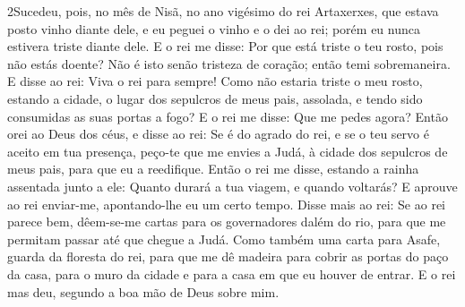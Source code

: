 \lettrine{2} Sucedeu, pois, no mês de Nisã, no ano vigésimo do
rei Artaxerxes, que estava posto vinho diante dele, e eu peguei o
vinho e o dei ao rei; porém eu nunca estivera triste diante dele.
E o rei me disse: Por que está triste o teu rosto, pois não
estás doente? Não é isto senão tristeza de coração; então temi
sobremaneira. E disse ao rei: Viva o rei para sempre! Como não
estaria triste o meu rosto, estando a cidade, o lugar dos sepulcros
de meus pais, assolada, e tendo sido consumidas as suas portas a
fogo? E o rei me disse: Que me pedes agora? Então orei ao Deus
dos céus, e disse ao rei: Se é do agrado do rei, e se o teu
servo é aceito em tua presença, peço-te que me envies a Judá, à
cidade dos sepulcros de meus pais, para que eu a reedifique.
Então o rei me disse, estando a rainha assentada junto a ele:
Quanto durará a tua viagem, e quando voltarás? E aprouve ao rei
enviar-me, apontando-lhe eu um certo tempo. Disse mais ao rei:
Se ao rei parece bem, dêem-se-me cartas para os governadores dalém
do rio, para que me permitam passar até que chegue a Judá. Como
também uma carta para Asafe, guarda da floresta do rei, para que me
dê madeira para cobrir as portas do paço da casa, para o muro da
cidade e para a casa em que eu houver de entrar. E o rei mas deu,
segundo a boa mão de Deus sobre mim.

